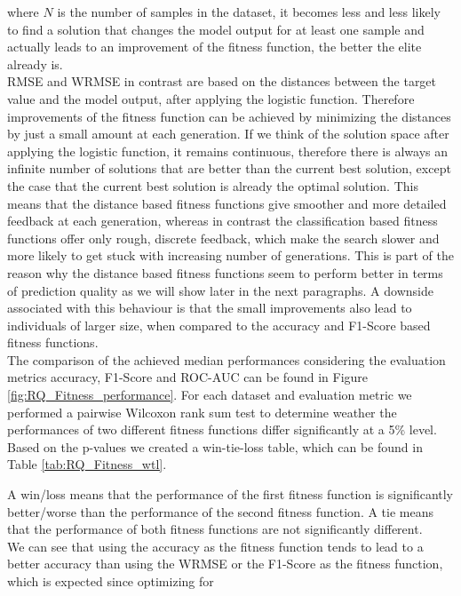 \documentclass[manuscript, review, anonymous]{acmart} %
\begin{document}
where $N$ is the number of samples in the dataset, it becomes less and less likely to find a 
solution that changes the model output for at least one sample and actually leads to an improvement of the fitness function,
the better the elite already is.\\
RMSE and WRMSE in contrast are based on the distances
between the target value and the model output,
after applying the logistic function. Therefore improvements of the 
fitness function can be achieved by minimizing the distances by
just a small amount at each generation. 
If we think of the solution space after applying the logistic function, it remains continuous,
therefore there is always an infinite number of solutions that are better than the current best solution,
except the case that the current best solution is already the optimal solution.
This means that the distance based fitness functions give smoother
and more detailed feedback at each generation,
whereas in contrast the classification based fitness functions offer only
rough, discrete feedback, which make the search slower
and more likely to get stuck with increasing number of generations. This is part of
the reason why the distance based fitness functions seem to
perform better in terms
of prediction quality as we will show later in the next paragraphs. A downside associated with this behaviour
is that the small improvements
also lead to individuals  of larger size, when compared to the accuracy and F1-Score based fitness functions.\\
The comparison of the achieved median performances considering the evaluation
metrics accuracy, F1-Score and ROC-AUC can be found in
Figure \ref{fig:RQ_Fitness_performance}. %
For each dataset and evaluation metric we performed a pairwise
Wilcoxon rank sum test to determine weather the performances
of two different fitness functions differ significantly at a 5\%
level.
Based on the p-values we created a win-tie-loss table, which
can be found in Table \ref{tab:RQ_Fitness_wtl}.

\noindent A win/loss means that the performance of the first fitness
function is significantly better/worse than the performance of the second
fitness function.
A tie means that the performance of both fitness functions are not significantly different.\\
We can see that using the accuracy as the fitness
function tends to lead to a better accuracy
than using the WRMSE or the F1-Score as the fitness
function, which is expected since optimizing for
\end{document}
